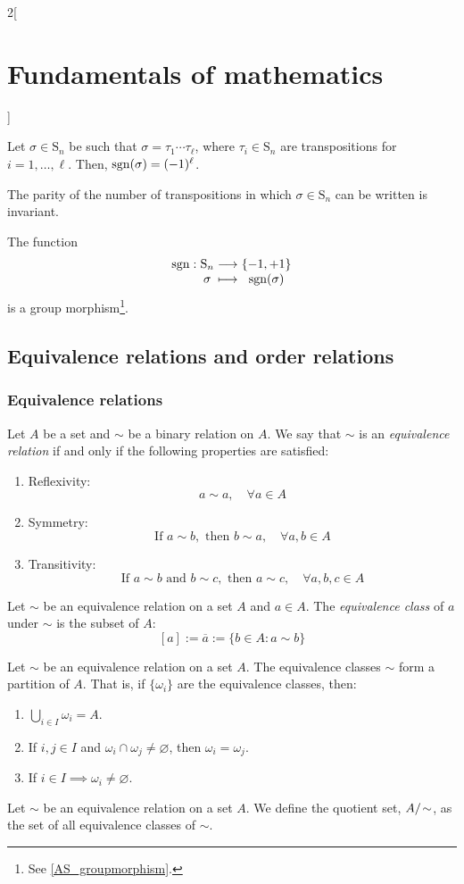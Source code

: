 \documentclass[../../../main_math.tex]{subfiles}
\begin{document}
\begin{multicols}{2}[\section{Fundamentals of mathematics}]
\begin{corollary}
    Let $\sigma\in \text{S}_n$ be such that $\sigma=\tau_1\cdots\tau_\ell$, where $\tau_i\in \text{S}_n$ are transpositions for $i=1,\ldots,\ell$. Then, $\operatorname{sgn}(\sigma)=(-1)^\ell$.
  \end{corollary}
  \begin{corollary}
    The parity of the number of transpositions in which $\sigma\in \text{S}_n$ can be written is invariant.
  \end{corollary}
  \begin{corollary}
    The function
    $$\function{\sign}{\text{S}_n}{\{-1,+1\}}{\sigma}{\sign(\sigma)}$$
    is a group morphism\footnote{See \cref{AS_groupmorphism}.}.
  \end{corollary}
  \subsection{Equivalence relations and order relations}
  \subsubsection{Equivalence relations}
  \begin{definition}
    Let $A$ be a set and $\sim$ be a binary relation on $A$. We say that $\sim$ is an \emph{equivalence relation} if and only if the following properties are satisfied:
    \begin{enumerate}
      \item Reflexivity: $$a\sim a,\quad\forall a\in A$$
      \item Symmetry: $$\text{If }a\sim b, \text{ then }b\sim a,\quad\forall a,b\in A$$
      \item Transitivity:
            $$\text{If }a\sim b\text{ and }b\sim c,\text{ then }a\sim c,\quad\forall a,b,c\in A$$
    \end{enumerate}
  \end{definition}
  \begin{definition}
    Let $\sim$ be an equivalence relation on a set $A$ and $a\in A$. The \emph{equivalence class} of $a$ under $\sim$ is the subset of $A$: $$[a]:=\overline{a}:=\{b\in A: a\sim b\}$$
  \end{definition}
  \begin{theorem}
    Let $\sim$ be an equivalence relation on a set $A$. The equivalence classes $\sim$ form a partition of $A$. That is, if $\{\omega_i\}$ are the equivalence classes, then:
    \begin{enumerate}
      \item $\bigcup_{i\in I} \omega_i=A$.
      \item If $i,j\in I$ and $\omega_i\cap\omega_j\ne\varnothing$, then $\omega_i=\omega_j$.
      \item If $i\in I\implies\omega_i\ne\varnothing$.
    \end{enumerate}
  \end{theorem}
  \begin{definition}
    Let $\sim$ be an equivalence relation on a set $A$. We define the quotient set, $\quot{A}{\!\sim}$, as the set of all equivalence classes of $\sim$.
  \end{definition}

\end{multicols}
\end{document}
